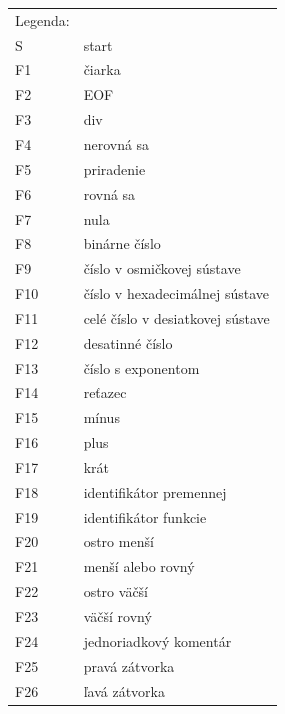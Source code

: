 \documentclass [11pt, a4paper]{article}
\begin{document}
\begin{table}[h]
\begin{tabular}{l l}
Legenda:& \\
S &\qquad start\\
F1 &\qquad čiarka\\
F2 &\qquad EOF\\
F3 &\qquad div\\
F4 &\qquad nerovná sa \\
F5 &\qquad priradenie\\
F6 &\qquad rovná sa\\
F7 &\qquad nula\\
F8 &\qquad binárne číslo\\
F9 & \qquad číslo v osmičkovej sústave\\
F10&\qquad číslo v hexadecimálnej sústave\\
F11&\qquad celé číslo v desiatkovej sústave\\
F12&\qquad desatinné číslo\\
F13&\qquad číslo s exponentom\\
F14&\qquad reťazec\\
F15& \qquad mínus\\
F16&\qquad plus\\
F17&\qquad krát\\
F18&\qquad identifikátor premennej\\
F19&\qquad identifikátor funkcie\\
F20&\qquad ostro menší\\
F21&\qquad menší alebo rovný\\
F22&\qquad ostro väčší\\
F23&\qquad väčší rovný\\
F24&\qquad jednoriadkový komentár\\
F25&\qquad pravá zátvorka\\
F26&\qquad ľavá zátvorka\\
\end{tabular}
\end{table}
\end{document}
